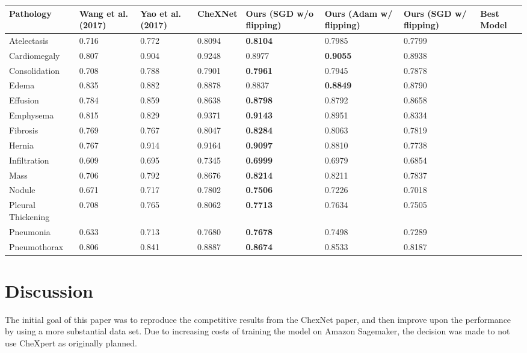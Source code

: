 \documentclass{amia}
\begin{document}
\begin{center}
\begin{tabular}{p{3cm}|p{1.5cm}|p{1.5cm}|p{1.5cm}|p{1.5cm}|p{1.5cm}|p{1.5cm}}
Pathology & Wang et al. (2017) & Yao et al. (2017) & CheXNet & Ours (SGD w/o flipping) & Ours (Adam w/ flipping) & Ours (SGD w/ flipping) & Best Model \\
\midrule
Atelectasis & 0.716 & 0.772 & 0.8094 & \textbf{0.8104} & 0.7985 & 0.7799 \\
Cardiomegaly & 0.807 & 0.904 & 0.9248 & 0.8977 & \textbf{0.9055} & 0.8938 \\
Consolidation & 0.708 & 0.788 & 0.7901 & \textbf{0.7961} & 0.7945 & 0.7878 \\
Edema & 0.835 & 0.882 & 0.8878 & 0.8837 & \textbf{0.8849} & 0.8790 \\
Effusion & 0.784 & 0.859 & 0.8638 & \textbf{0.8798} & 0.8792 & 0.8658 \\
Emphysema & 0.815 & 0.829 & 0.9371 & \textbf{0.9143} & 0.8951 & 0.8334 \\
Fibrosis & 0.769 & 0.767 & 0.8047 & \textbf{0.8284} & 0.8063 & 0.7819 \\
Hernia & 0.767 & 0.914 & 0.9164 & \textbf{0.9097} & 0.8810 & 0.7738 \\
Infiltration & 0.609 & 0.695 & 0.7345 & \textbf{0.6999} & 0.6979 & 0.6854 \\
Mass & 0.706 & 0.792 & 0.8676 & \textbf{0.8214} & 0.8211 & 0.7837 \\
Nodule & 0.671 & 0.717 & 0.7802 & \textbf{0.7506} & 0.7226 & 0.7018 \\
Pleural Thickening & 0.708 & 0.765 & 0.8062 & \textbf{0.7713} & 0.7634 & 0.7505 \\
Pneumonia & 0.633 & 0.713 & 0.7680 & \textbf{0.7678} & 0.7498 & 0.7289 \\
Pneumothorax & 0.806 & 0.841 & 0.8887 & \textbf{0.8674} & 0.8533 & 0.8187 \\
\end{tabular}
\end{center}


\section*{Discussion}

The initial goal of this paper was to reproduce the competitive results from the ChexNet paper, and then improve upon the performance by using a more substantial data set. Due to increasing costs of training the model on Amazon Sagemaker, the decision was made to not use CheXpert as originally planned.
\end{document}
